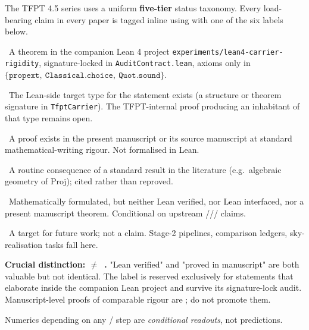 \documentclass[11pt,a4paper]{article}
\begin{document}
\begin{tfptstatusbox}
The TFPT 4.5 series uses a uniform \textbf{five-tier} status
taxonomy. Every load-bearing claim in every paper is tagged
inline using \stag{$\cdot$} with one of the six labels below.

\begin{description}[leftmargin=2em, itemsep=2pt]
    \item[\stag{L} \,Lean verified.]\ A theorem in the companion
        Lean 4 project
        \texttt{experiments/lean4-carrier-rigidity},
        signature-locked in \texttt{AuditContract.lean}, axioms
        only in
        $\{\texttt{propext},\ \texttt{Classical.choice},\ \texttt{Quot.sound}\}$.
    \item[\stag{I} \,Lean interfaced.]\ The Lean-side target
        type for the statement exists (a structure or theorem
        signature in \texttt{TfptCarrier}). The TFPT-internal
        proof producing an inhabitant of that type remains open.
    \item[\stag{M} \,Manuscript theorem.]\ A proof exists in
        the present manuscript or its source manuscript at
        standard mathematical-writing rigour. Not formalised
        in Lean.
    \item[\stag{S} \,Standard-theorem interface.]\ A routine
        consequence of a standard result in the literature
        (e.g.\ algebraic geometry of $\mathrm{Proj}$); cited
        rather than reproved.
    \item[\stag{C} \,Conditional downstream proposal.]\
        Mathematically formulated, but neither Lean verified,
        nor Lean interfaced, nor a present manuscript theorem.
        Conditional on upstream
        /// claims.
    \item[\stag{P} \,Programmatic target.]\ A target for future
        work; not a claim. Stage-2 pipelines, comparison
        ledgers, sky-realisation tasks fall here.
\end{description}

\noindent
\textbf{Crucial distinction:  \boldmath$\neq$\unboldmath\ .}
"Lean verified" and "proved in manuscript" are both valuable
but not identical. The label  is reserved exclusively
for statements that elaborate inside the companion Lean project
and survive its signature-lock audit. Manuscript-level proofs
of comparable rigour are ; do not promote them.

\noindent
Numerics depending on any / step are
\emph{conditional readouts}, not predictions.
\end{tfptstatusbox}
\end{document}
